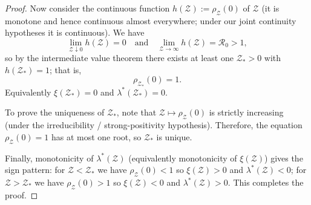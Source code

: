 \documentclass[a4paper,11pt]{amsart}
\theoremstyle{definition}
\numberwithin{equation}{section}
\theoremstyle{definition}
\begin{document}
\begin{proof}
Now consider the continuous function \(h(\mathcal Z):=\rho_{\mathcal Z}(0)\) of \(\mathcal Z\) (it is monotone and hence continuous almost everywhere; under our joint continuity hypotheses it is continuous). We have
\[
\lim_{\mathcal Z\downarrow 0} h(\mathcal Z)=0 \quad\text{and}\quad \lim_{\mathcal Z\to\infty} h(\mathcal Z)=\mathcal R_0>1,
\]
so by the intermediate value theorem there exists at least one \(\mathcal Z_\ast>0\) with \(h(\mathcal Z_\ast)=1\); that is,
\[
\rho_{\mathcal Z_\ast}(0)=1.
\]
Equivalently \(\xi(\mathcal Z_\ast)=0\) and \(\lambda^\ast(\mathcal Z_\ast)=0\).

To prove the uniqueness of \(\mathcal Z_\ast\), note that \(\mathcal Z\mapsto \rho_{\mathcal Z}(0)\) is strictly increasing (under the irreducibility / strong-positivity hypothesis). Therefore, the equation \(\rho_{\mathcal Z}(0)=1\) has at most one root, so \(\mathcal Z_\ast\) is unique.

Finally, monotonicity of \(\lambda^\ast(\mathcal Z)\) (equivalently monotonicity of \(\xi(\mathcal Z)\)) gives the sign pattern: for \(\mathcal Z<\mathcal Z_\ast\) we have \(\rho_{\mathcal Z}(0)<1\) so \(\xi(\mathcal Z)>0\) and \(\lambda^\ast(\mathcal Z)<0\); for \(\mathcal Z>\mathcal Z_\ast\) we have \(\rho_{\mathcal Z}(0)>1\) so \(\xi(\mathcal Z)<0\) and \(\lambda^\ast(\mathcal Z)>0\). This completes the proof.
\end{proof}
\end{document}
